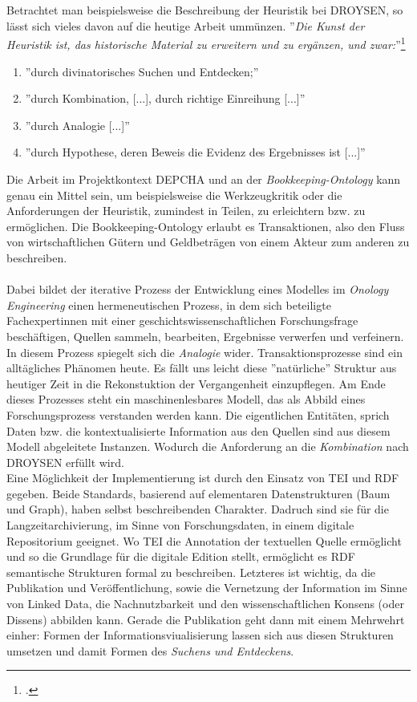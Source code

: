 \documentclass[12pt,a4paper]{article}
\begin{document}
{\\
\\
Betrachtet man beispielsweise die Beschreibung der Heuristik bei DROYSEN, so lässt sich vieles davon auf die heutige Arbeit ummünzen. ''\textit{Die Kunst der Heuristik ist, das historische Material zu erweitern und zu ergänzen, und zwar:}''\footcite[][S.96]{hardtwig1990studium}
\begin{enumerate}[label=(\alph*)]
\item ''durch divinatorisches Suchen und Entdecken;'' 
\item ''durch Kombination, [...], durch richtige Einreihung [...]''
\item ''durch Analogie [...]'' 
\item ''durch Hypothese, deren Beweis die Evidenz des Ergebnisses ist [...]''
\end{enumerate}
Die Arbeit im Projektkontext DEPCHA und an der \textit{Bookkeeping-Ontology} kann genau ein Mittel sein, um beispielsweise die Werkzeugkritik oder die Anforderungen der Heuristik, zumindest in Teilen, zu erleichtern bzw. zu ermöglichen. Die Bookkeeping-Ontology erlaubt es Transaktionen, also den Fluss von wirtschaftlichen Gütern und Geldbeträgen von einem Akteur zum anderen zu beschreiben.
\\
\\
Dabei bildet der iterative Prozess der Entwicklung eines Modelles im \textit{Onology Engineering} einen hermeneutischen Prozess, in dem sich beteiligte Fachexpertinnen mit einer geschichtswissenschaftlichen Forschungsfrage beschäftigen, Quellen sammeln, bearbeiten, Ergebnisse verwerfen und verfeinern. In diesem Prozess spiegelt sich die \textit{Analogie} wider. Transaktionsprozesse sind ein alltägliches Phänomen heute. Es fällt uns leicht diese ''natürliche'' Struktur aus heutiger Zeit in die Rekonstuktion der Vergangenheit einzupflegen.  Am Ende dieses Prozesses steht ein maschinenlesbares Modell, das als Abbild eines Forschungsprozess verstanden werden kann. Die eigentlichen Entitäten, sprich Daten bzw. die kontextualisierte Information aus den Quellen sind aus diesem Modell abgeleitete Instanzen.
Wodurch die Anforderung an die \textit{Kombination} nach DROYSEN erfüllt wird.
\\
Eine Möglichkeit der Implementierung ist durch den Einsatz von TEI und RDF gegeben. Beide Standards, basierend auf elementaren Datenstrukturen (Baum und Graph), haben selbst beschreibenden Charakter. Dadruch sind sie für die Langzeitarchivierung, im Sinne von Forschungsdaten, in einem digitale Repositorium geeignet. Wo TEI die Annotation  der textuellen Quelle ermöglicht und so die Grundlage für die digitale Edition stellt, ermöglicht es RDF semantische Strukturen formal zu beschreiben. Letzteres ist wichtig, da die Publikation und Veröffentlichung, sowie die Vernetzung der Information im Sinne von Linked Data, die Nachnutzbarkeit und den wissenschaftlichen Konsens (oder Dissens) abbilden kann. Gerade die Publikation geht dann mit einem Mehrwehrt einher: Formen der Informationsviualisierung lassen sich aus diesen Strukturen umsetzen und damit Formen des \textit{Suchens und Entdeckens}.
}
\end{document}
